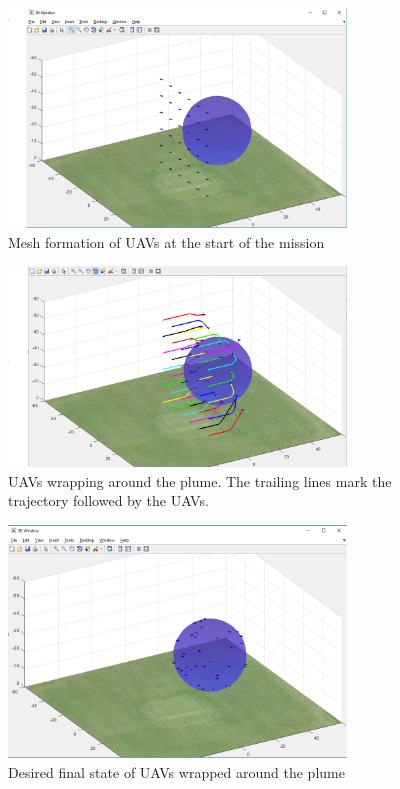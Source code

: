 \begin{figure}[hbtp]
\centering
\includegraphics[width=0.8\textwidth]{Chapter-3/figs/initial_drone_config}
\caption{Mesh formation of UAVs at the start of the mission}
\label{fig:mesh_formation}
\end{figure}

\begin{figure}[hbtp]
\centering
\includegraphics[width=0.8\textwidth]{Chapter-3/figs/intermediate_state}
\caption{UAVs wrapping around the plume. The trailing lines mark the trajectory followed by the UAVs.}
\label{fig:intermediate_state}
\end{figure}

\begin{figure}[hbtp]
\centering
\includegraphics[width=0.8\textwidth]{Chapter-3/figs/final_formation}
\caption{Desired final state of UAVs wrapped around the plume}
\label{fig:final_state}
\end{figure}


